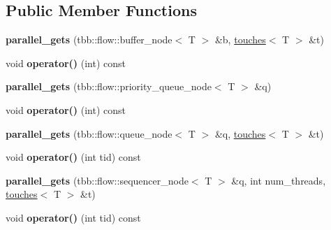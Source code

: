 \subsection*{Public Member Functions}
\begin{DoxyCompactItemize}
\item 
\hypertarget{structparallel__gets_abbe3d7de6775f7f451d8705522c66dc3}{}{\bfseries parallel\+\_\+gets} (tbb\+::flow\+::buffer\+\_\+node$<$ T $>$ \&b, \hyperlink{structtouches}{touches}$<$ T $>$ \&t)\label{structparallel__gets_abbe3d7de6775f7f451d8705522c66dc3}

\item 
\hypertarget{structparallel__gets_a31583281596ae92d931987e90aaf7e74}{}void {\bfseries operator()} (int) const \label{structparallel__gets_a31583281596ae92d931987e90aaf7e74}

\item 
\hypertarget{structparallel__gets_aec71afdf769571132409431485574bd7}{}{\bfseries parallel\+\_\+gets} (tbb\+::flow\+::priority\+\_\+queue\+\_\+node$<$ T $>$ \&q)\label{structparallel__gets_aec71afdf769571132409431485574bd7}

\item 
\hypertarget{structparallel__gets_a31583281596ae92d931987e90aaf7e74}{}void {\bfseries operator()} (int) const \label{structparallel__gets_a31583281596ae92d931987e90aaf7e74}

\item 
\hypertarget{structparallel__gets_a6a5c200a36a43cb1ef0b29b4f49e94a6}{}{\bfseries parallel\+\_\+gets} (tbb\+::flow\+::queue\+\_\+node$<$ T $>$ \&q, \hyperlink{structtouches}{touches}$<$ T $>$ \&t)\label{structparallel__gets_a6a5c200a36a43cb1ef0b29b4f49e94a6}

\item 
\hypertarget{structparallel__gets_a45274a6d1d5cf49f8162211b27dfa94d}{}void {\bfseries operator()} (int tid) const \label{structparallel__gets_a45274a6d1d5cf49f8162211b27dfa94d}

\item 
\hypertarget{structparallel__gets_a15f699d69d183c82b9552da7d09b0322}{}{\bfseries parallel\+\_\+gets} (tbb\+::flow\+::sequencer\+\_\+node$<$ T $>$ \&q, int num\+\_\+threads, \hyperlink{structtouches}{touches}$<$ T $>$ \&t)\label{structparallel__gets_a15f699d69d183c82b9552da7d09b0322}

\item 
\hypertarget{structparallel__gets_a45274a6d1d5cf49f8162211b27dfa94d}{}void {\bfseries operator()} (int tid) const \label{structparallel__gets_a45274a6d1d5cf49f8162211b27dfa94d}

\end{DoxyCompactItemize}

